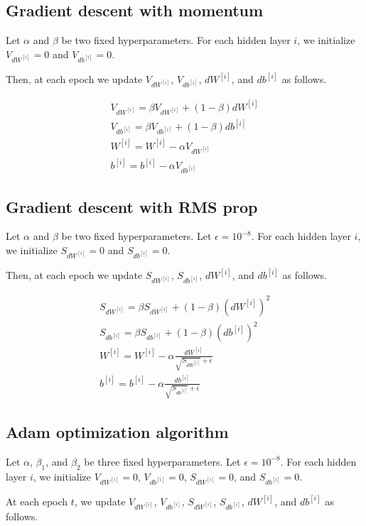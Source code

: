 \subsection{Gradient descent with momentum}
	Let $\alpha$ and $\beta$ be two fixed hyperparameters.
	For each hidden layer $i$, we initialize $V_{dW^{[i]}}=0$ and $V_{db^{[i]}}=0$.
	
	Then, at each epoch we update  $V_{dW^{[i]}}$, $V_{db^{[i]}}$, $dW^{[i]}$, and $db^{[i]}$ as follows.
	
	\begin{align}
		V_{dW^{[i]}} = \beta V_{dW^{[i]}} + (1-\beta) dW^{[i]}\\
		V_{db^{[i]}} = \beta V_{db^{[i]}} + (1-\beta) db^{[i]}\\
		W^{[i]} = W^{[i]} - \alpha V_{dW^{[i]}} \\
		b^{[i]} = b^{[i]} - \alpha V_{db^{[i]}} 
	\end{align}

\subsection{Gradient descent with RMS prop}
	Let $\alpha$ and $\beta$ be two fixed hyperparameters.
	Let $\epsilon=10^{-8}$.
	For each hidden layer $i$, we initialize $S_{dW^{[i]}}=0$ and $S_{db^{[i]}}=0$.
	
	Then, at each epoch we update  $S_{dW^{[i]}}$, $S_{db^{[i]}}$, $dW^{[i]}$, and $db^{[i]}$ as follows.
	
	\begin{align}
	S_{dW^{[i]}} = \beta S_{dW^{[i]}} + (1-\beta) (dW^{[i]})^2\\
	S_{db^{[i]}} = \beta S_{db^{[i]}} + (1-\beta) (db^{[i]})^2\\
	W^{[i]} = W^{[i]} - \alpha \frac{dW^{[i]}}{\sqrt{S_{dW^{[i]}}}+\epsilon} \\
	b^{[i]} = b^{[i]} - \alpha \frac{db^{[i]}}{\sqrt{S_{db^{[i]}}}+\epsilon}
	\end{align}

\subsection{Adam optimization algorithm}
	Let $\alpha$, $\beta_1$, and $\beta_2$ be three fixed hyperparameters.
	Let $\epsilon=10^{-8}$.
	For each hidden layer $i$, we initialize $V_{dW^{[i]}}=0$, $V_{db^{[i]}}=0$, $S_{dW^{[i]}}=0$, and $S_{db^{[i]}}=0$.
	
	At each epoch $t$, we update  $V_{dW^{[i]}}$, $V_{db^{[i]}}$, $S_{dW^{[i]}}$, $S_{db^{[i]}}$, $dW^{[i]}$, and $db^{[i]}$ as follows.
	
